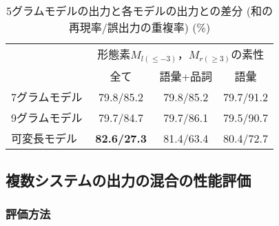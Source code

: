 \begin{table}
\begin{center}
\caption{5グラムモデルの出力と各モデルの出力との差分 (和の再現率/誤出力の重複率) (\%)}
\label{tab:dif_indivi}
\begin{tabular}{|l||c|c|c|} \hline
	& \multicolumn{3}{|c|}{形態素$M_{l(\leq -3)}$，$M_{r(\geq 3)}$の素性} \\ \cline{2-4} 
        	& \ \ \ 全て\ \ \  & 語彙+品詞 & 語彙 \\ \hline\hline
7グラムモデル  	& 79.8/85.2 & 	79.8/85.2  & 79.7/91.2 	 \\ \hline
9グラムモデル  	& 79.7/84.7 & 79.7/86.1 & 79.5/90.7  \\ \hline
可変長モデル	&	{\bf 82.6/27.3} &  81.4/63.4 & 80.4/72.7 \\ \hline
\end{tabular}
\vspace*{-.5cm}
\end{center}
\end{table}

\subsection{複数システムの出力の混合の性能評価}

\subsubsection{評価方法}

